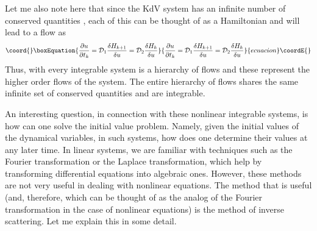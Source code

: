 \documentclass[a4paper,11pt]{article}
\begin{document}
Let me also note here that since the KdV system has an infinite number
of conserved quantities \coordHE{}, each of this can be
thought of as a Hamiltonian and will lead to a flow as
\begin{equation}\coord{}\boxEquation{
{\partial u\over \partial t_{k}} = {\cal D}_{1} {\delta H_{k+1}\over
\delta u} = {\cal D}_{2} {\delta H_{k}\over \delta u}
}{
{\partial u\over \partial t_{k}} = {\cal D}_{1} {\delta H_{k+1}\over
\delta u} = {\cal D}_{2} {\delta H_{k}\over \delta u}
}{ecuacion}\coordE{}\end{equation}
Thus, with every integrable system is a hierarchy of flows and these
represent the higher order flows of the system. The entire hierarchy
of flows shares the same infinite set of conserved quantities and are
integrable. 


An interesting question, in connection with these nonlinear integrable
systems, is how can one solve the initial value problem. Namely, given
the initial values of the dynamical variables, in such systems, how
does one determine their values at any later time. In linear systems,
we are familiar with techniques such as the Fourier transformation or
the Laplace transformation, which help by transforming differential
equations into algebraic ones. However, these methods are not very
useful in dealing with nonlinear equations. The method that is useful
(and, therefore, which can be thought of as the analog of the Fourier
transformation in the case of nonlinear equations) is the method of
inverse scattering. Let me explain this in some detail.
\end{document}
